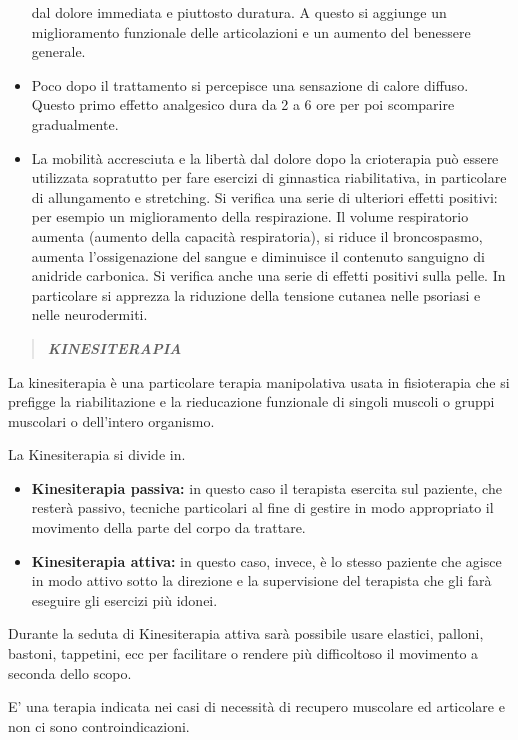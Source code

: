 \documentclass[]{article}
\begin{document}
\begin{itemize}
  dal dolore immediata e piuttosto duratura. A questo si aggiunge un
  miglioramento funzionale delle articolazioni e un aumento del
  benessere generale.
\item
  Poco dopo il trattamento si percepisce una sensazione di calore
  diffuso. Questo primo effetto analgesico dura da 2 a 6 ore per poi
  scomparire gradualmente.
\item
  La mobilità accresciuta e la libertà dal dolore dopo la crioterapia
  può essere utilizzata sopratutto per fare esercizi di ginnastica
  riabilitativa, in particolare di allungamento e stretching. Si
  verifica una serie di ulteriori effetti positivi: per esempio un
  miglioramento della respirazione. Il volume respiratorio aumenta
  (aumento della capacità respiratoria), si riduce il broncospasmo,
  aumenta l'ossigenazione del sangue e diminuisce il contenuto sanguigno
  di anidride carbonica. Si verifica anche una serie di effetti positivi
  sulla pelle. In particolare si apprezza la riduzione della tensione
  cutanea nelle psoriasi e nelle neurodermiti.
\end{itemize}

\begin{quote}
\textbf{\emph{KINESITERAPIA}}
\end{quote}

La kinesiterapia è una particolare terapia manipolativa usata in
fisioterapia che si prefigge la riabilitazione e la rieducazione
funzionale di singoli muscoli o gruppi muscolari o dell'intero
organismo.

La Kinesiterapia si divide in.

\begin{itemize}
\item
  \textbf{Kinesiterapia passiva:} in questo caso il terapista esercita
  sul paziente, che resterà passivo, tecniche particolari al fine di
  gestire in modo appropriato il movimento della parte del corpo da
  trattare.
\item
  \textbf{Kinesiterapia attiva:} in questo caso, invece, è lo stesso
  paziente che agisce in modo attivo sotto la direzione e la
  supervisione del terapista che gli farà eseguire gli esercizi più
  idonei.
\end{itemize}

Durante la seduta di Kinesiterapia attiva sarà possibile usare elastici,
palloni, bastoni, tappetini, ecc per facilitare o rendere più
difficoltoso il movimento a seconda dello scopo.

E' una terapia indicata nei casi di necessità di recupero muscolare ed
articolare e non ci sono controindicazioni.
\end{document}

